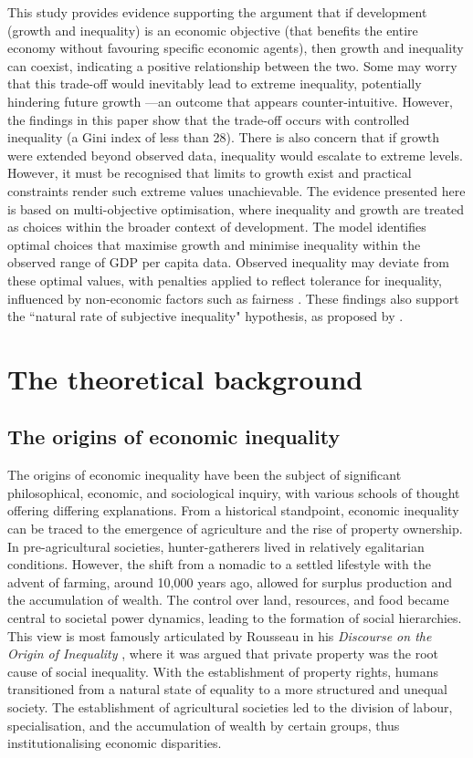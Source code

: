 This study provides evidence supporting the argument that if development (growth and inequality) is an economic objective (that benefits the entire economy without favouring specific economic agents), then growth and inequality can coexist, indicating a positive relationship between the two. Some may worry that this trade-off would inevitably lead to extreme inequality, potentially hindering future growth \parencite{berg2017inequality}—an outcome that appears counter-intuitive. However, the findings in this paper show that the trade-off occurs with controlled inequality (a Gini index of less than 28). There is also concern that if growth were extended beyond observed data, inequality would escalate to extreme levels. However, it must be recognised that limits to growth \parencite{meadows2018limits} exist and practical constraints render such extreme values unachievable. The evidence presented here is based on multi-objective optimisation, where inequality and growth are treated as choices within the broader context of development. The model identifies optimal choices that maximise growth and minimise inequality within the observed range of GDP per capita data. Observed inequality may deviate from these optimal values, with penalties applied to reflect tolerance for inequality, influenced by non-economic factors such as fairness \parencite{cojocaru2014fairness}. These findings also support the ``natural rate of subjective inequality" hypothesis, as proposed by \textcite{lambert2003inequality}. 

\section{The theoretical background}
\subsection{The origins of economic inequality}

The origins of economic inequality have been the subject of significant philosophical, economic, and sociological inquiry, with various schools of thought offering differing explanations. From a historical standpoint, economic inequality can be traced to the emergence of agriculture and the rise of property ownership. In pre-agricultural societies, hunter-gatherers lived in relatively egalitarian conditions. However, the shift from a nomadic to a settled lifestyle with the advent of farming, around 10,000 years ago, allowed for surplus production and the accumulation of wealth. The control over land, resources, and food became central to societal power dynamics, leading to the formation of social hierarchies. This view is most famously articulated by Rousseau in his \textit{Discourse on the Origin of Inequality} \parencite*{rousseau1755}, where it was argued that private property was the root cause of social inequality. With the establishment of property rights, humans transitioned from a natural state of equality to a more structured and unequal society. The establishment of agricultural societies led to the division of labour, specialisation, and the accumulation of wealth by certain groups, thus institutionalising economic disparities.


